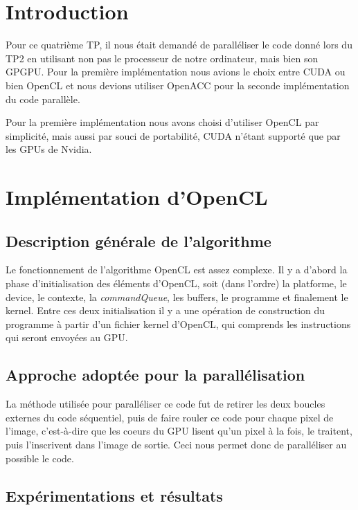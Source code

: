 \documentclass[11pt]{report}
\begin{document}
\newpage

\onehalfspace
\tableofcontents
\listoffigures
\newpage
\chapter{Introduction}

	Pour ce quatrième TP, il nous était demandé de paralléliser le code donné lors du TP2 en utilisant non pas le processeur de notre ordinateur, mais bien son GPGPU. Pour la première implémentation nous avions le choix entre CUDA ou bien OpenCL et nous devions utiliser OpenACC pour la seconde implémentation du code parallèle.
	
	\bigskip
	Pour la première implémentation nous avons choisi d'utiliser OpenCL par simplicité, mais aussi par souci de portabilité, CUDA n'étant supporté que par les GPUs de Nvidia.
	
\clearpage
\setcounter{chapter}{0}
\chapter{Implémentation d'OpenCL}

	\section{Description générale de l'algorithme}
		Le fonctionnement de l'algorithme OpenCL est assez complexe. Il y a d'abord la phase d'initialisation des éléments d'OpenCL, soit (dans l'ordre) la platforme, le device, le contexte, la \textit{commandQueue}, les buffers, le programme et finalement le kernel. Entre ces deux initialisation il y a une opération de construction du programme à partir d'un fichier kernel d'OpenCL, qui comprends les instructions qui seront envoyées au GPU.
	
	\section{Approche adoptée pour la parallélisation}
		La méthode utilisée pour paralléliser ce code fut de retirer les deux boucles externes du code séquentiel, puis de faire rouler ce code pour chaque pixel de l'image, c'est-à-dire que les coeurs du GPU lisent qu'un pixel à la fois, le traitent, puis l'inscrivent dans l'image de sortie. Ceci nous permet donc de paralléliser au possible le code.
	
	\section{Expérimentations et résultats}
	
\end{document}
